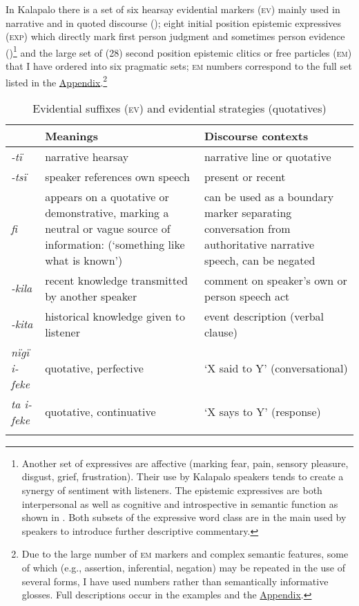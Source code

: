 \documentclass[output=paper]{langsci/langscibook}
\begin{document}
In Kalapalo there is a set of six hearsay evidential markers (\textsc{ev}) mainly used in narrative and in quoted discourse ();  eight initial position epistemic expressives (\textsc{exp}) which directly mark first person judgment  and sometimes  person evidence ()\footnote{Another set of expressives are affective (marking fear, pain, sensory pleasure, disgust, grief, frustration). Their use by Kalapalo speakers tends to create a synergy of sentiment with listeners. The epistemic expressives are both interpersonal as well as cognitive and introspective in semantic function as shown in . Both subsets of the expressive word class are in the main used by speakers to introduce further descriptive commentary.}
and the  large set of (28) second position epistemic clitics or free particles (\textsc{em}) that I have ordered into six pragmatic sets; \textsc{em} numbers correspond to the full set listed in the \hyperref[eb-appendix]{Appendix}.\footnote{Due to the large number of \textsc{em} markers and complex semantic features, some of which (e.g., assertion, inferential, negation) may be repeated in the use of several forms, I have used numbers rather than semantically informative glosses. Full descriptions occur in the examples and the \hyperref[eb-appendix]{Appendix}.}
 
\begin{table}
\begin{tabularx}{\textwidth}{L{1.5cm}QQ}
\lsptoprule
 & \textbf{Meanings} & \textbf{Discourse contexts}\\
\midrule
\textit{	-tï	}	&	narrative hearsay	&	narrative  line or quotative	\\
\tablevspace
\textit{-tsï} & speaker references own speech & present or recent \\
\tablevspace
\textit{	fi	}	&	appears on a quotative or demonstrative, marking  a neutral or vague  source of information: (`something like what is known')	&	can be used as a boundary marker separating conversation from authoritative narrative speech, can be negated\\
\tablevspace
\textit{	-kila	}	&	recent knowledge transmitted by another speaker &	comment on speaker's own or  person speech act	\\
\tablevspace
\textit{	-kita	}	&	historical knowledge given to listener	&	event description (verbal clause)	\\
\tablevspace
\textit{	nïgï i-feke	}	&	quotative, perfective	&	‘X said to Y’ (conversational)	\\
\tablevspace
\textit{	ta i-feke	}	&	quotative, continuative	&	‘X says to Y’ (response)	\\
\lspbottomrule
\end{tabularx}
\caption{Evidential suffixes (\textsc{ev}) and evidential strategies (quotatives)}
\label{tab:eb1}
\end{table}
\end{document}
